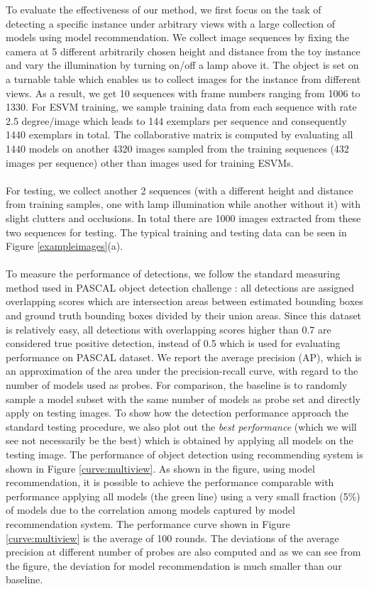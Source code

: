 \documentclass{article} %
\begin{document}
To evaluate the effectiveness of our method, we first focus on the task of detecting a specific instance under arbitrary views with a large collection of models using model recommendation. We collect image sequences by fixing the camera at 5 different arbitrarily chosen height and distance from the toy instance and vary the illumination by turning on/off a lamp above it. The object is set on a turnable table which enables us to collect images for the instance from different views. As a result, we get 10 sequences with frame numbers ranging from 1006 to 1330. For ESVM training, we sample training data from each sequence with rate 2.5 degree/image which leads to 144 exemplars per sequence and consequently 1440 exemplars in total. The collaborative matrix is computed by evaluating all 1440 models on another 4320 images sampled from the training sequences (432 images per sequence) other than images used for training ESVMs. \\\\
For testing, we collect another 2 sequences (with a different height and distance from training samples, one with lamp illumination while another without it) with slight clutters and occlusions. In total there are 1000 images extracted from these two sequences for testing. The typical training and testing data can be seen in Figure \ref{exampleimages}(a). \\\\
To measure the performance of detections, we follow the standard measuring method used in PASCAL object detection challenge \cite{pascal-voc-2007}: all detections are assigned overlapping scores which are intersection areas between estimated bounding boxes and ground truth bounding boxes divided by their union areas. Since this dataset is relatively easy, all detections with overlapping scores higher than 0.7 are considered true positive detection, instead of 0.5 which is used for evaluating performance on PASCAL dataset. We report the average precision (AP), which is an approximation of the area under the precision-recall curve, with regard to the number of models used as probes. For comparison, the baseline is to randomly sample a model subset with the same number of models as probe set and directly apply on testing images. To show how the detection performance approach the standard testing procedure, we also plot out the \emph{best performance} (which we will see not necessarily be the best) which is obtained by applying all models on the testing image. The performance of object detection using recommending system is shown in Figure \ref{curve:multiview}. As shown in the figure, using model recommendation, it is possible to achieve the performance comparable with performance applying all models (the green line) using a very small fraction (5\%) of models due to the correlation among models captured by model recommendation system. The performance curve shown in Figure \ref{curve:multiview} is the average of 100 rounds. The deviations of the average precision at different number of probes are also computed and as we can see from the figure, the deviation for model recommendation is much smaller than our baseline.
\end{document}
